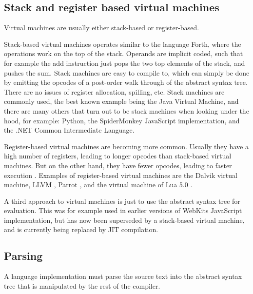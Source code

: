 \documentclass[11pt]{report}
\begin{document}

\subsection{Stack and register based virtual machines}
Virtual machines are usually either stack-based or register-based.

Stack-based virtual machines operates similar to the language Forth, where the operations work on the top of the stack. 
Operands are implicit coded, such that for example the add instruction just pops the two top elements of the stack, and pushes the sum. 
Stack machines are easy to compile to, 
which can simply be done by emitting the opcodes of a post-order walk through of the abstract syntax tree. 
There are no issues of register allocation, spilling, etc.
Stack machines are commonly used, the best known example being the Java Virtual Machine, and there are many others that turn out to be stack machines when looking under the hood, for example: Python, the SpiderMonkey JavaScript implementation, and the .NET Common Intermediate Language.

Register-based virtual machines are becoming more common. 
Usually they have a high number of registers, leading to longer opcodes than stack-based virtual machines. But on the other hand, they have fewer opcodes, leading to faster execution \cite{register-vs-stack1, register-vs-stack2}. 
Examples of register-based virtual machines are the Dalvik \cite{dalvik-vm} virtual machine, LLVM \cite{llvm}, Parrot \cite{parrot}, and the virtual machine of Lua 5.0 \cite{luavm}.

A third approach to virtual machines is just to use the abstract syntax tree for evaluation. This was for example used in earlier versions of WebKits JavaScript implementation, but has now been superseded by a stack-based virtual machine, and is currently being replaced by JIT compilation.

\subsection{Parsing}
A language implementation must parse the source text into the abstract syntax tree that is manipulated by the rest of the compiler.
\end{document}
